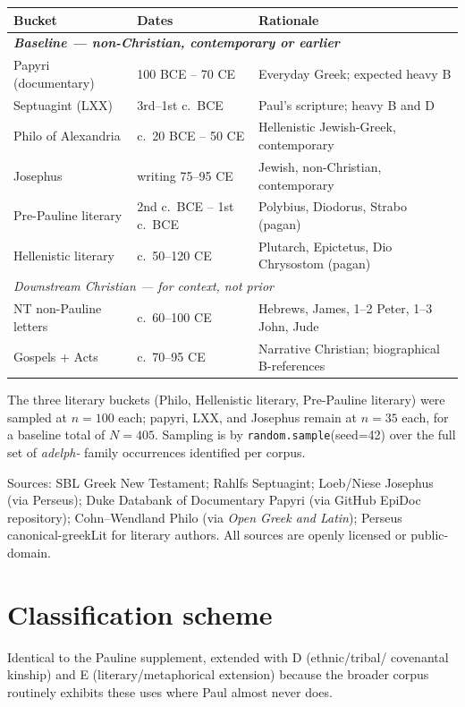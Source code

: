 \documentclass[11pt,oneside]{article}
\begin{document}
\begin{center}
\begin{tabular}{@{}lll@{}}
\toprule
Bucket & Dates & Rationale \\
\midrule
\multicolumn{3}{l}{\textit{\textbf{Baseline — non-Christian, contemporary or earlier}}} \\
Papyri (documentary) & 100 BCE – 70 CE & Everyday Greek; expected heavy B \\
Septuagint (LXX) & 3rd–1st c.\ BCE & Paul's scripture; heavy B and D \\
Philo of Alexandria & c.\ 20 BCE – 50 CE & Hellenistic Jewish-Greek, contemporary \\
Josephus & writing 75–95 CE & Jewish, non-Christian, contemporary \\
Pre-Pauline literary & 2nd c.\ BCE – 1st c.\ BCE & Polybius, Diodorus, Strabo (pagan) \\
Hellenistic literary & c.\ 50–120 CE & Plutarch, Epictetus, Dio Chrysostom (pagan) \\
\midrule
\multicolumn{3}{l}{\textit{Downstream Christian — for context, not prior}} \\
NT non-Pauline letters & c.\ 60–100 CE & Hebrews, James, 1–2 Peter, 1–3 John, Jude \\
Gospels + Acts & c.\ 70–95 CE & Narrative Christian; biographical B-references \\
\bottomrule
\end{tabular}
\end{center}

The three literary buckets (Philo, Hellenistic literary, Pre-Pauline
literary) were sampled at $n = 100$ each; papyri, LXX, and Josephus
remain at $n = 35$ each, for a baseline total of $N = 405$.
Sampling is by \texttt{random.sample}(seed=42) over the full set of
\textit{adelph-} family occurrences identified per corpus.

Sources: SBL Greek New Testament; Rahlfs Septuagint; Loeb/Niese
Josephus (via Perseus); Duke Databank of Documentary Papyri (via GitHub
EpiDoc repository); Cohn--Wendland Philo (via \textit{Open Greek and
Latin}); Perseus canonical-greekLit for literary authors.  All sources
are openly licensed or public-domain.

\section*{Classification scheme}

Identical to the Pauline supplement, extended with D (ethnic/tribal/
covenantal kinship) and E (literary/metaphorical extension) because the
broader corpus routinely exhibits these uses where Paul almost never
does.
\end{document}
